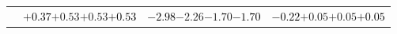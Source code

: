 \documentclass[compress]{beamer}
\begin{document}
\begin{frame}
\begin{tabular}{r | c | c | c}
          & \textcolor{black}{$+0.37$}\hspace{0.1 cm}$+0.53$\hspace{0.1 cm}$+0.53$\hspace{0.1 cm}\textcolor{black}{$+0.53$} & \textcolor{black}{$-2.98$}\hspace{0.1 cm}$-2.26$\hspace{0.1 cm}$-1.70$\hspace{0.1 cm}\textcolor{black}{$-1.70$} & \textcolor{black}{$-0.22$}\hspace{0.1 cm}$+0.05$\hspace{0.1 cm}$+0.05$\hspace{0.1 cm}\textcolor{black}{$+0.05$} \\
\end{tabular}
\end{frame}
\end{document}

